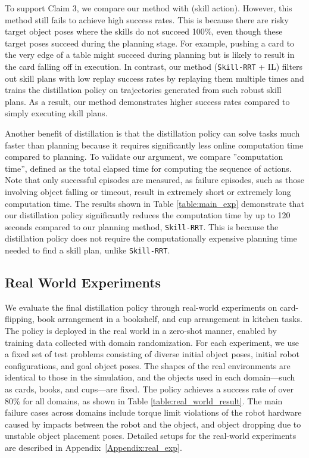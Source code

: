 To support Claim 3, we compare our method with \skillrrt (skill action). However, this method still fails to achieve high success rates. This is because there are risky target object poses where the skills do not succeed 100\%, even though these target poses succeed during the planning stage. For example, pushing a card to the very edge of a table might succeed during planning but is likely to result in the card falling off in execution. In contrast, our method (\texttt{Skill-RRT} + IL) filters out skill plans with low replay success rates by replaying them multiple times and trains the distillation policy on trajectories generated from such robust skill plans. As a result, our method demonstrates higher success rates compared to simply executing skill plans.

Another benefit of distillation is that the distillation policy can solve tasks much faster than planning because it requires significantly less online computation time compared to planning. To validate our argument, we compare ''computation time'', defined as the total elapsed time for computing the sequence of actions. Note that only successful episodes are measured, as failure episodes, such as those involving object falling or timeout, result in extremely short or extremely long computation time. The results shown in Table \ref{table:main_exp} demonstrate that our distillation policy significantly reduces the computation time by up to 120 seconds compared to our planning method, \texttt{Skill-RRT}. This is because the distillation policy does not require the computationally expensive planning time needed to find a skill plan, unlike \texttt{Skill-RRT}.



\subsection{Real World Experiments}
We evaluate the final distillation policy through real-world experiments on card-flipping, book arrangement in a bookshelf, and cup arrangement in kitchen tasks. The policy is deployed in the real world in a zero-shot manner, enabled by training data collected with domain randomization. For each experiment, we use a fixed set of test problems consisting of diverse initial object poses, initial robot configurations, and goal object poses. The shapes of the real environments are identical to those in the simulation, and the objects used in each domain—such as cards, books, and cups—are fixed. The policy achieves a success rate of over 80\% for all domains, as shown in Table \ref{table:real_world_result}. The main failure cases across domains include torque limit violations of the robot hardware caused by impacts between the robot and the object, and object dropping due to unstable object placement poses. Detailed setups for the real-world experiments are described in Appendix~\ref{Appendix:real_exp}.

